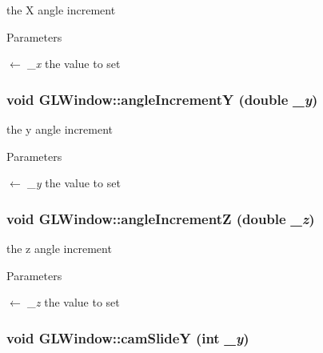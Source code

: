 the X angle increment 
\begin{DoxyParams}{Parameters}
\item[\mbox{$\leftarrow$} {\em \_\-x}]the value to set \end{DoxyParams}
\hypertarget{classGLWindow_a4a47782943f7050554d040fe32428a35}{
\subsubsection[{angleIncrementY}]{\setlength{\rightskip}{0pt plus 5cm}void GLWindow::angleIncrementY (double {\em \_\-y})}}
\label{classGLWindow_a4a47782943f7050554d040fe32428a35}


the y angle increment 
\begin{DoxyParams}{Parameters}
\item[\mbox{$\leftarrow$} {\em \_\-y}]the value to set \end{DoxyParams}
\hypertarget{classGLWindow_a578d29435e038115f63fc895c39d5a02}{
\subsubsection[{angleIncrementZ}]{\setlength{\rightskip}{0pt plus 5cm}void GLWindow::angleIncrementZ (double {\em \_\-z})}}
\label{classGLWindow_a578d29435e038115f63fc895c39d5a02}


the z angle increment 
\begin{DoxyParams}{Parameters}
\item[\mbox{$\leftarrow$} {\em \_\-z}]the value to set \end{DoxyParams}
\hypertarget{classGLWindow_a0661e6689c42d4ddfb97117de6e343bc}{
\subsubsection[{camSlideY}]{\setlength{\rightskip}{0pt plus 5cm}void GLWindow::camSlideY (int {\em \_\-y})}}
\label{classGLWindow_a0661e6689c42d4ddfb97117de6e343bc}



